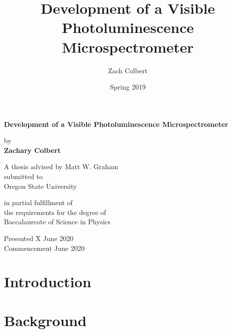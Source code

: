 \documentclass[12pt]{article}
\title{Development of a Visible Photoluminescence Microspectrometer}
\author{Zach Colbert}
\date{Spring 2019}
\renewenvironment{abstract}
 {%
  \global\setbox\abstractbox=\vtop\bgroup
  \begin{center}\bfseries\abstractname\end{center}%
 }
 {\par\egroup}
\begin{document}

  \begin{titlepage}
    \begin{center}
        \vspace*{1cm}
  
        \textbf{Development of a Visible Photoluminescence Microspectrometer}
  
        \vspace{1.5cm}
  
        by \\
        \textbf{Zachary Colbert}
  
        \vspace{5cm}
  
        A thesis advised by Matt W. Graham \\
        submitted to \\
        Oregon State University

        \vspace{1.5cm}

        in partial fulfillment of \\
        the requirements for the degree of \\
        Baccalaureate of Science in Physics
  
        \vfill
  
        Presented X June 2020 \\
        Commencement June 2020
  
    \end{center}
  \end{titlepage}

  

  \tableofcontents
  \listoffigures


  \section{Introduction}
  

  \section{Background}
  
\end{document}
